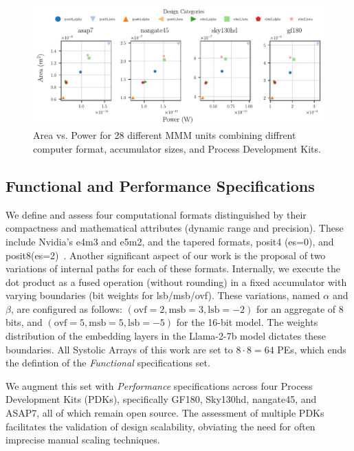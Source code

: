 \begin{figure}[b]
\centering
	\vspace{-0.5cm}
	\includegraphics[width=0.9\columnwidth]{./figures/power_vs_area_comparison.pdf}
	\vspace{-0.5cm}
	\caption{Area vs. Power for 28 different MMM units combining diffrent computer format, accumulator sizes, and Process Development Kits.}
	\label{fig:power_vs_area}
\end{figure}

\subsection{Functional and Performance Specifications}
\label{sec:specifications}
We define and assess four computational formats distinguished by their compactness and mathematical attributes (dynamic range and precision).
These include Nvidia's e4m3 and e5m2, and the tapered formats, posit4 (es=0), and posit8(es=2)~\cite{micikevicius_fp8_2022,gustafson_beating_2017}.
Another significant aspect of our work is the proposal of two variations of internal paths for each of these formats.
Internally, we execute the dot product as a fused operation (without rounding) in a fixed accumulator with varying boundaries (bit weights for lsb/msb/ovf).
These variations, named $\alpha$ and $\beta$, are configured as follows: $(\text{ovf}=2,\text{msb}=3,\text{lsb}=-2)$ for an aggregate of 8 bits, and $(\text{ovf}=5,\text{msb}=5,\text{lsb}=-5)$ for the 16-bit model.
The weights distribution of the embedding layers in the Llama-2-7b model dictates these boundaries.
All Systolic Arrays of this work are set to $8 \cdot 8=64$ PEs, which ends the defintion of the \textit{Functional} specifications set.

We augment this set with \textit{Performance} specifications across four Process Development Kits (PDKs), specifically GF180, Sky130hd, nangate45, and ASAP7, all of which remain open source.
The assessment of multiple PDKs facilitates the validation of design scalability, obviating the need for often imprecise manual scaling techniques.

